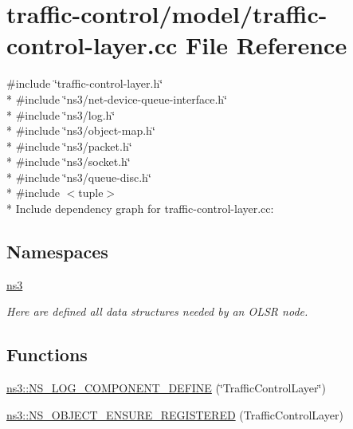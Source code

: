 \hypertarget{traffic-control-layer_8cc}{}\section{traffic-\/control/model/traffic-\/control-\/layer.cc File Reference}
\label{traffic-control-layer_8cc}
{\ttfamily \#include \char`\"{}traffic-\/control-\/layer.\+h\char`\"{}}\\*
{\ttfamily \#include \char`\"{}ns3/net-\/device-\/queue-\/interface.\+h\char`\"{}}\\*
{\ttfamily \#include \char`\"{}ns3/log.\+h\char`\"{}}\\*
{\ttfamily \#include \char`\"{}ns3/object-\/map.\+h\char`\"{}}\\*
{\ttfamily \#include \char`\"{}ns3/packet.\+h\char`\"{}}\\*
{\ttfamily \#include \char`\"{}ns3/socket.\+h\char`\"{}}\\*
{\ttfamily \#include \char`\"{}ns3/queue-\/disc.\+h\char`\"{}}\\*
{\ttfamily \#include $<$tuple$>$}\\*
Include dependency graph for traffic-\/control-\/layer.cc\+:
\subsection*{Namespaces}
\begin{DoxyCompactItemize}
\item 
 \hyperlink{namespacens3}{ns3}
\begin{DoxyCompactList}\small\item\em Here are defined all data structures needed by an O\+L\+SR node. \end{DoxyCompactList}\end{DoxyCompactItemize}
\subsection*{Functions}
\begin{DoxyCompactItemize}
\item 
\hyperlink{namespacens3_aca22115c135e4b357ff487d504115363}{ns3\+::\+N\+S\+\_\+\+L\+O\+G\+\_\+\+C\+O\+M\+P\+O\+N\+E\+N\+T\+\_\+\+D\+E\+F\+I\+NE} (\char`\"{}Traffic\+Control\+Layer\char`\"{})
\item 
\hyperlink{namespacens3_a2bf8295022949d442d1085addc6c2c25}{ns3\+::\+N\+S\+\_\+\+O\+B\+J\+E\+C\+T\+\_\+\+E\+N\+S\+U\+R\+E\+\_\+\+R\+E\+G\+I\+S\+T\+E\+R\+ED} (Traffic\+Control\+Layer)
\end{DoxyCompactItemize}
